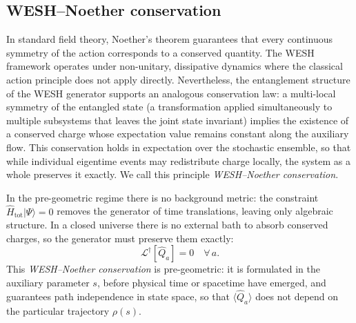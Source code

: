 \documentclass[12pt,a4paper]{article}
\numberwithin{equation}{section}
\begin{document}
\subsection{WESH--Noether conservation}
\label{sec:wesh-noether}

\vspace{0.3cm}

In standard field theory, Noether's theorem guarantees that every continuous symmetry of the action corresponds to a conserved quantity. The WESH framework operates under non-unitary, dissipative dynamics where the classical action principle does not apply directly. Nevertheless, the entanglement structure of the WESH generator supports an analogous conservation law: a multi-local symmetry of the entangled state (a transformation applied simultaneously to multiple subsystems that leaves the joint state invariant) implies the existence of a conserved charge whose expectation value remains constant along the auxiliary flow. This conservation holds in expectation over the stochastic ensemble, so that while individual eigentime events may redistribute charge locally, the system as a whole preserves it exactly. We call this principle \emph{WESH--Noether conservation}.

In the pre-geometric regime there is no background metric: the constraint 
$\hat{H}_{\mathrm{tot}}|\Psi\rangle = 0$ removes the generator of time 
translations, leaving only algebraic structure. In a closed universe 
there is no external bath to absorb conserved charges, so the generator 
must preserve them exactly:
\begin{equation}
\mathcal{L}^\dagger[\hat{Q}_a] = 0 \quad \forall\, a.
\label{eq:wesh-noether-constraint}
\end{equation}
This \emph{WESH--Noether conservation} is pre-geometric: it is formulated
in the auxiliary parameter $s$, before physical time or spacetime have
emerged, and guarantees path independence in state space, so that
$\langle\hat{Q}_a\rangle$ does not depend on the particular trajectory
$\rho(s)$.
\end{document}
